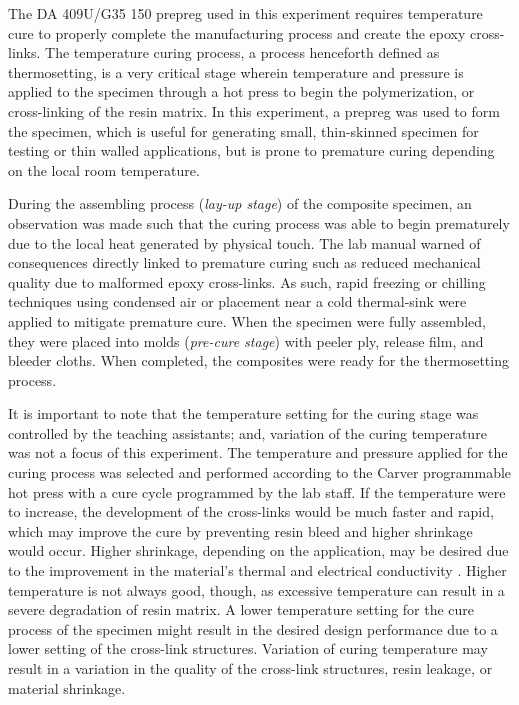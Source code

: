 The DA 409U/G35 150 prepreg used in this experiment requires temperature cure to properly complete the manufacturing process and create the epoxy cross-links.  The temperature curing process, a process henceforth defined as thermosetting, is a very critical stage wherein temperature and pressure is applied to the specimen through a hot press to begin the polymerization, or cross-linking of the resin matrix.  In this experiment, a prepreg was used to form the specimen, which is useful for generating small, thin-skinned specimen for testing or thin walled applications, but is prone to premature curing depending on the local room temperature.

During the assembling process (\textit{lay-up stage}) of the composite specimen, an observation was made such that the curing process was able to begin prematurely due to the local heat generated by physical touch.  The lab manual warned of consequences directly linked to premature curing such as reduced mechanical quality due to malformed epoxy cross-links.  As such, rapid freezing or chilling techniques using condensed air or placement near a cold thermal-sink were applied to mitigate premature cure.  When the specimen were fully assembled, they were placed into molds (\textit{pre-cure stage}) with peeler ply, release film, and bleeder cloths.  When completed, the composites were ready for the thermosetting process.

\newpage
It is important to note that the temperature setting for the curing stage was controlled by the teaching assistants; and, variation of the curing temperature was not a focus of this experiment.  The temperature and pressure applied for the curing process was selected and performed according to the Carver programmable hot press with a cure cycle programmed by the lab staff.  If the temperature were to increase, the development of the cross-links would be much faster and rapid, which may improve the cure by preventing resin bleed and higher shrinkage would occur.  Higher shrinkage, depending on the application, may be desired due to the improvement in the material's thermal and electrical conductivity \cite{curematters}.  Higher temperature is not always good, though, as excessive temperature can result in a severe degradation of resin matrix.\cite{boeingcuring}  A lower temperature setting for the cure process of the specimen might result in the desired design performance due to a lower setting of the cross-link structures.  Variation of curing temperature may result in a variation in the quality of the cross-link structures, resin leakage, or material shrinkage.